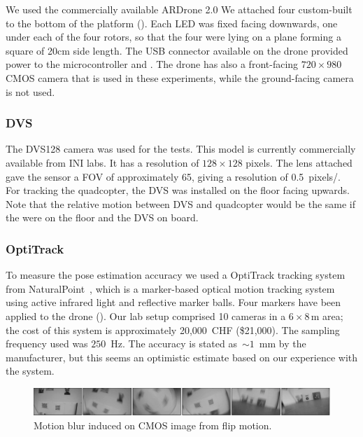 We used the commercially available ARDrone 2.0 We attached four custom-built
\ALMs to the bottom of the platform ().
Each LED was fixed facing downwards, one under each of the four rotors,
so that the four were lying on a plane forming a square of 20cm side
length. The USB connector available on the drone provided power to
the microcontroller and \ALMs. The drone has also a front-facing
$720\times980$ CMOS camera that is used in these experiments, while
the ground-facing camera is not used.


\subsubsection{DVS}

The DVS128 camera was used for the tests. This model is currently
commercially available from INI labs. It has a resolution of $128\times128$
pixels. The lens attached gave the sensor a FOV of approximately 65\textdegree{},
giving a resolution of 0.5~pixels/\textdegree{}. For tracking the
quadcopter, the DVS was installed on the floor facing upwards. Note
that the relative motion between DVS and quadcopter would be the same
if the \ALMs were on the floor and the DVS on board.


\subsubsection{OptiTrack}

To measure the pose estimation accuracy we used a OptiTrack tracking
system from NaturalPoint~\cite{optitrack}, which is a marker-based
optical motion tracking system using active infrared light and reflective
marker balls. Four markers have been applied to the drone ().
Our lab setup comprised 10 cameras in a $6\times8\,\mbox{m}$ area;
the cost of this system is approximately 20,000~CHF (\$21,000). The
sampling frequency used was $250$~Hz. The accuracy is stated as~$\sim1$~mm
by the manufacturer, but this seems an optimistic estimate based on
our experience with the system.



\begin{figure}
\begin{centering}

\par\end{centering}

\begin{centering}
\includegraphics[width=17cm]{figures/slides/flip_sequence_small}
\par\end{centering}

\caption{\label{fig:Motion-blur-induced}Motion blur induced on CMOS image
from flip motion.}
\end{figure}



